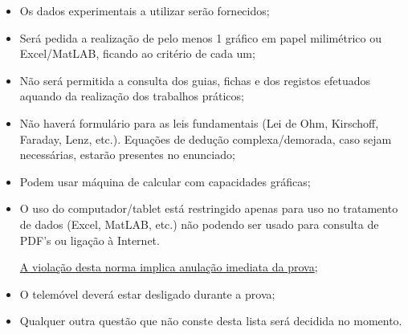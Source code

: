\documentclass[11pt,a4paper,final]{article}
\begin{document}
\begin{itemize}
\item Os dados experimentais a utilizar ser\~{a}o fornecidos;

\item Ser\'{a} pedida a realiza\c{c}\~{a}o de pelo menos 1 gr\'{a}fico em papel milim\'{e}trico ou Excel/MatLAB, ficando ao crit\'{e}rio de cada um;

\item N\~{a}o ser\'{a} permitida a consulta dos guias, fichas e dos registos efetuados aquando da realiza\c{c}\~{a}o dos trabalhos pr\'{a}ticos;

\item N\~{a}o haver\'{a} formul\'{a}rio para as leis fundamentais (Lei de Ohm, Kirschoff, Faraday, Lenz, etc.). Equa\c{c}\~{o}es de dedu\c{c}\~{a}o complexa/demorada, caso sejam necess\'{a}rias, estar\~{a}o presentes no enunciado;

\item Podem usar m\' {a}quina de calcular com capacidades gr\'{a}ficas;

\item O uso do computador/tablet est\'{a} restringido apenas para uso no tratamento de dados (Excel, MatLAB, etc.) n\~{a}o podendo ser usado para consulta de PDF's ou liga\c{c}\~{a}o \`{a} Internet.

\underline{A viola\c{c}\~{a}o desta norma implica anula\c{c}\~{a}o imediata da prova};

\item O telem\'{o}vel dever\'{a} estar desligado durante a prova;

\item Qualquer outra questão que não conste desta lista será decidida no momento.
\end{itemize}
\end{document}
